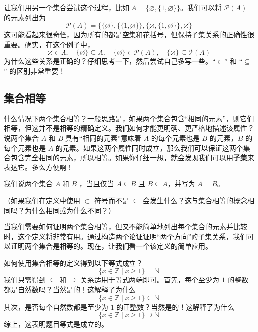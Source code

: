 \begin{example}
    让我们用另一个集合尝试这个过程，比如 $A = \{\varnothing, \{1, \varnothing\}\}$。我们可以将 $\mathcal{P}(A)$ 的元素列出为
    \[\mathcal{P}(A) = \{\{\varnothing\}, \{\{1, \varnothing\}\}, \{\varnothing, \{1, \varnothing\}\}, \varnothing \}\]
    这可能看起来很奇怪，因为所有的都是空集和花括号，但保持子集关系的正确性很重要。确实，在这个例子中，
    \[\varnothing \in A, \quad \{\varnothing\} \subseteq A, \quad \{\varnothing\} \in \mathcal{P}(A), \quad \{\varnothing\} \subseteq \mathcal{P}(A)\]
    为什么这些关系是正确的？仔细思考一下，然后尝试自己多写一些。``$\in$'' 和 ``$\subseteq$'' 的区别非常重要！
\end{example}

\subsection{集合相等}

什么情况下两个集合相等？一般思路是，如果两个集合包含``相同的元素''，则它们相等，但这并不是相等的精确定义。我们如何才能更明确、更严格地描述该属性？说两个集合 $A$ 和 $B$ 具有``相同的元素''意味着 $A$ 的每个元素也是 $B$ 的元素，$B$ 的每个元素也是 $A$ 的元素。如果这两个属性同时成立，那么我们可以保证这两个集合包含完全相同的元素，所以相等。如果你仔细一想，就会发现我们可以用\textbf{子集}来表达它。多么方便啊！

\begin{definition}
    我们说两个集合 $A$ 和 $B$ ，当且仅当 $A \subseteq B$ 且 $B \subseteq A$，并写为 $A = B$。
\end{definition}
（如果我们在定义中使用 $\subset$ 符号而不是 $\subseteq$ 会发生什么？这与集合相等的概念相同吗？为什么相同或为什么不同？）

当我们需要如何证明两个集合相等，但又不能简单地列出每个集合的元素并比较时，这个定义将非常有用。通过构造两个论证证明``两个方向''的子集关系，我们可以证明两个集合是相等的。现在，让我们看一个该定义的简单应用。\\

\begin{example}
    如何使用集合相等的定义得到以下等式成立？
    \[\{x \in \mathbb{Z} \mid x \ge 1\} = \mathbb{N}\]
    我们只需得到 $\subseteq$ 和 $\supseteq$ 关系适用于等式两端即可。首先，每个至少为 $1$ 的整数都是自然数吗？当然是的！这解释了为什么
    \[\{x \in \mathbb{Z} \mid x \ge 1\} \subseteq \mathbb{N}\]
    其次，是否每个自然数都是至少为 $1$ 的正整数？当然是的！这解释了为什么
    \[\{x \in \mathbb{Z} \mid x \ge 1\} \supseteq \mathbb{N}\]
    综上，这表明题目等式是成立的。
\end{example}

